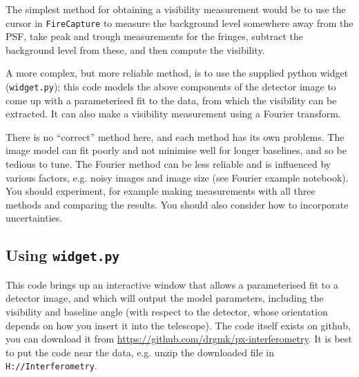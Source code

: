 \documentclass[11pt]{article}
\begin{document}
The simplest method for obtaining a visibility measurement would be to use the cursor in \texttt{FireCapture} to measure the background level somewhere away from the PSF, take peak and trough measurements for the fringes, subtract the background level from these, and then compute the visibility.

A more complex, but more reliable method, is to use the supplied python widget (\texttt{widget.py}); this code models the above components of the detector image to come up with a parameterised fit to the data, from which the visibility can be extracted. It can also make a visibility measurement using a Fourier transform.

There is no ``correct'' method here, and each method has its own problems. The image model can fit poorly and not minimise well for longer baselines, and so be tedious to tune. The Fourier method can be less reliable and is influenced by various factors, e.g. noisy images and image size (see Fourier example notebook). You should experiment, for example making measurements with all three methods and comparing the results. You should also consider how to incorporate uncertainties.

\subsection{Using \texttt{widget.py}}\label{sec:widget}

This code brings up an interactive window that allows a parameterised fit to a detector image, and which will output the model parameters, including the visibility and baseline angle (with respect to the detector, whose orientation depends on how you insert it into the telescope). The code itself exists on github, you can download it from
\href{https://github.com/drgmk/px-interferometry}{https://github.com/drgmk/px-interferometry}. It is best to put the code near the data, e.g. unzip the downloaded file in \texttt{H://Interferometry}.
\end{document}

